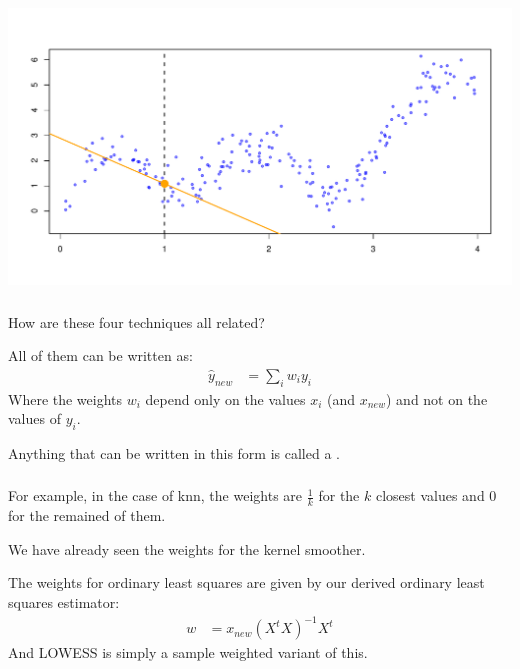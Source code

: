\documentclass[xetex,mathserif,serif,aspectratio=169]{beamer}
\begin{document}
\begin{frame}[fragile] \frametitle{} \oldB \small

\begin{center}
\includegraphics[width=\textwidth]{img/lowess3.pdf}
\end{center}

\end{frame}

\begin{frame}[fragile] \frametitle{} \oldB \small


How are these four techniques all related?\pause

All of them can be written as:
\begin{align*}
\widehat{y}_{new} &= \sum_i w_i y_i
\end{align*}
Where the weights $w_i$ depend only on the values $x_i$ (and $x_{new}$)
and not on the values of $y_i$.

\pause Anything that can be written in this form is called
a .

\end{frame}

\begin{frame}[fragile] \frametitle{} \oldB \small


For example, in the case of knn, the weights are $\frac{1}{k}$
for the $k$ closest values and $0$ for the remained of them.

\pause We have already seen the weights for the kernel smoother.

\pause The weights for ordinary least squares are given by our
derived ordinary least squares estimator:
\begin{align*}
w &= x_{new} (X^t X)^{-1} X^t
\end{align*}
And LOWESS is simply a sample weighted variant of this.

\end{frame}
\end{document}
